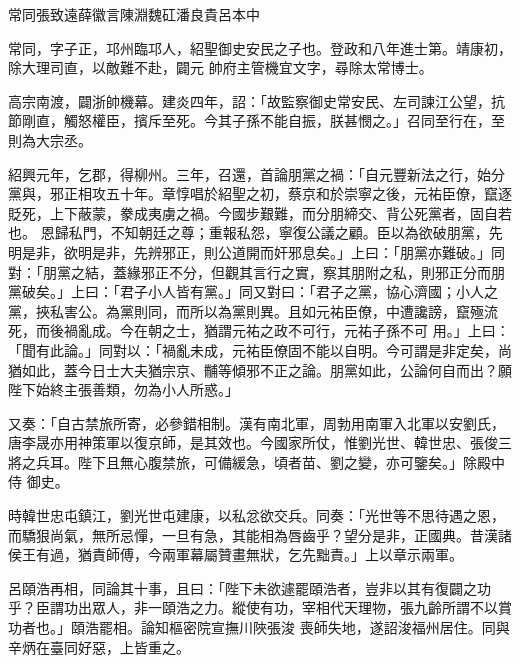 
\begin{pinyinscope}

 常同張致遠薛徽言陳淵魏矼潘良貴呂本中



 常同，字子正，邛州臨邛人，紹聖御史安民之子也。登政和八年進士第。靖康初，除大理司直，以敵難不赴，闢元
 帥府主管機宜文字，尋除太常博士。



 高宗南渡，闢浙帥機幕。建炎四年，詔：「故監察御史常安民、左司諫江公望，抗節剛直，觸怒權臣，擯斥至死。今其子孫不能自振，朕甚憫之。」召同至行在，至則為大宗丞。



 紹興元年，乞郡，得柳州。三年，召還，首論朋黨之禍：「自元豐新法之行，始分黨與，邪正相攻五十年。章惇唱於紹聖之初，蔡京和於崇寧之後，元祐臣僚，竄逐貶死，上下蔽蒙，豢成夷虜之禍。今國步艱難，而分朋締交、背公死黨者，固自若也。
 恩歸私門，不知朝廷之尊；重報私怨，寧復公議之顧。臣以為欲破朋黨，先明是非，欲明是非，先辨邪正，則公道開而奸邪息矣。」上曰：「朋黨亦難破。」同對：「朋黨之結，蓋緣邪正不分，但觀其言行之實，察其朋附之私，則邪正分而朋黨破矣。」上曰：「君子小人皆有黨。」同又對曰：「君子之黨，協心濟國；小人之黨，挾私害公。為黨則同，而所以為黨則異。且如元祐臣僚，中遭讒謗，竄殛流死，而後禍亂成。今在朝之士，猶謂元祐之政不可行，元祐子孫不可
 用。」上曰：「聞有此論。」同對以：「禍亂未成，元祐臣僚固不能以自明。今可謂是非定矣，尚猶如此，蓋今日士大夫猶宗京、黼等傾邪不正之論。朋黨如此，公論何自而出？願陛下始終主張善類，勿為小人所惑。」



 又奏：「自古禁旅所寄，必參錯相制。漢有南北軍，周勃用南軍入北軍以安劉氏，唐李晟亦用神策軍以復京師，是其效也。今國家所仗，惟劉光世、韓世忠、張俊三將之兵耳。陛下且無心腹禁旅，可備緩急，頃者苗、劉之變，亦可鑒矣。」除殿中侍
 御史。



 時韓世忠屯鎮江，劉光世屯建康，以私忿欲交兵。同奏：「光世等不思待遇之恩，而驕狠尚氣，無所忌憚，一旦有急，其能相為唇齒乎？望分是非，正國典。昔漢諸侯王有過，猶責師傅，今兩軍幕屬贊畫無狀，乞先黜責。」上以章示兩軍。



 呂頤浩再相，同論其十事，且曰：「陛下未欲遽罷頤浩者，豈非以其有復闢之功乎？臣謂功出眾人，非一頤浩之力。縱使有功，宰相代天理物，張九齡所謂不以賞功者也。」頤浩罷相。論知樞密院宣撫川陜張浚
 喪師失地，遂詔浚福州居住。同與辛炳在臺同好惡，上皆重之。




\end{pinyinscope}
